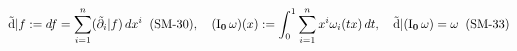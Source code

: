 \documentclass[preview]{standalone}
\begin{document}
\begin{align*}
\special{dvisvgm:raw <g id='unique000'>}\tilde{\mathrm{d}}|f := df = \sum_{i=1}^n (\tilde{\partial}_i|f)\,dx^i\;\;(\text{SM-30}), \quad (\mathrm{I}_{\mathbf{0}}\,\omega)(x) := \int_0^1 \sum_{i=1}^n x^i\omega_i(tx)\,dt, \quad \tilde{\mathrm{d}}|(\mathrm{I}_{\mathbf{0}}\,\omega) = \omega\;\;(\text{SM-33})\special{dvisvgm:raw </g>}
\end{align*}
\end{document}
